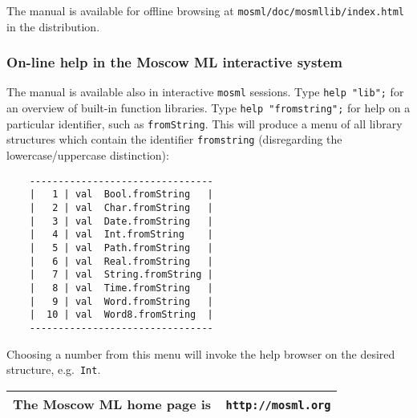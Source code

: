 \documentclass[fleqn,twoside,a4paper]{article}
\begin{document}
The manual is available for offline browsing at
\verb$mosml/doc/mosmllib/index.html$ in the distribution.

\subsubsection*{On-line help in the Moscow ML interactive system}

The manual is available also in interactive {\tt mosml} sessions.
Type {\tt help "lib";} for an overview of built-in function libraries.
Type {\tt help "fromstring";} for help on a particular identifier,
such as {\tt fromString}.  This will produce a menu of all library
structures which contain the identifier {\tt fromstring} (disregarding
the lowercase/uppercase distinction):

{\small\begin{verbatim}
    --------------------------------
    |   1 | val  Bool.fromString   |
    |   2 | val  Char.fromString   |
    |   3 | val  Date.fromString   |
    |   4 | val  Int.fromString    |
    |   5 | val  Path.fromString   |
    |   6 | val  Real.fromString   |
    |   7 | val  String.fromString |
    |   8 | val  Time.fromString   |
    |   9 | val  Word.fromString   |
    |  10 | val  Word8.fromString  |
    --------------------------------
\end{verbatim}}

\noindent Choosing a number from this menu will invoke the help
browser on the desired structure, e.g.\ {\tt Int}.  

\vfill

\begin{center}
\begin{tabular}{|c|}\hline
\rule[-0.4cm]{0cm}{1cm}The Moscow ML home page is\ \
    \verb$http://mosml.org$\\\hline
\end{tabular}
\end{center}

\newpage

\setcounter{page}{1}

\twocolumn
{\setlength{\parindent}{0cm}
\renewcommand{\contentsline}[3]{#2\hfill #3\hspace*{3em}\newline}
\tableofcontents
}
\onecolumn

\newpage 



\newpage


\end{document}
